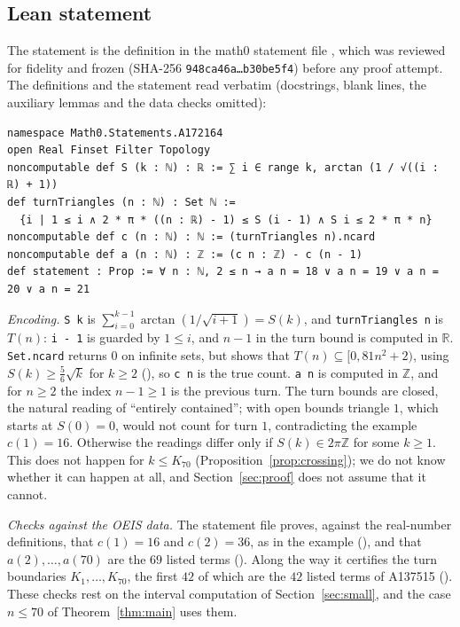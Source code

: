 \documentclass[11pt]{amsart}
\theoremstyle{plain}
\theoremstyle{definition}
\begin{document}
\subsection*{Lean statement}
The statement is the definition  in the math0 statement file , which was reviewed for fidelity and frozen (SHA-256 \texttt{948ca46a\dots b30be5f4}) before any proof attempt.
The definitions and the statement read verbatim (docstrings, blank lines, the auxiliary lemmas and the data checks omitted):\par\nobreak\noindent
\begin{minipage}{\linewidth}
\begin{lstlisting}
namespace Math0.Statements.A172164
open Real Finset Filter Topology
noncomputable def S (k : ℕ) : ℝ := ∑ i ∈ range k, arctan (1 / √((i : ℝ) + 1))
def turnTriangles (n : ℕ) : Set ℕ :=
  {i | 1 ≤ i ∧ 2 * π * ((n : ℝ) - 1) ≤ S (i - 1) ∧ S i ≤ 2 * π * n}
noncomputable def c (n : ℕ) : ℕ := (turnTriangles n).ncard
noncomputable def a (n : ℕ) : ℤ := (c n : ℤ) - c (n - 1)
def statement : Prop := ∀ n : ℕ, 2 ≤ n → a n = 18 ∨ a n = 19 ∨ a n = 20 ∨ a n = 21
\end{lstlisting}
\end{minipage}

\emph{Encoding.} \texttt{S k} is $\sum_{i=0}^{k-1}\arctan(1/\sqrt{i+1})=S(k)$, and \texttt{turnTriangles n} is $T(n)$: \texttt{i - 1} is guarded by $1\le i$, and $n-1$ in the turn bound is computed in $\mathbb R$.
\texttt{Set.ncard} returns $0$ on infinite sets, but  shows that $T(n)\subseteq[0,81n^2+2)$, using $S(k)\ge\frac56\sqrt k$ for $k\ge2$ (), so \texttt{c n} is the true count.
\texttt{a n} is computed in $\mathbb Z$, and for $n\ge2$ the index $n-1\ge1$ is the previous turn.
The turn bounds are closed, the natural reading of ``entirely contained''; with open bounds triangle $1$, which starts at $S(0)=0$, would not count for turn $1$, contradicting the example $c(1)=16$. Otherwise the readings differ only if $S(k)\in2\pi\mathbb Z$ for some $k\ge1$. This does not happen for $k\le K_{70}$ (Proposition~\ref{prop:crossing}); we do not know whether it can happen at all, and Section~\ref{sec:proof} does not assume that it cannot.

\emph{Checks against the OEIS data.} The statement file proves, against the real-number definitions, that $c(1)=16$ and $c(2)=36$, as in the example (), and that $a(2),\dots,a(70)$ are the $69$ listed terms ().
Along the way it certifies the turn boundaries $K_1,\dots,K_{70}$, the first $42$ of which are the $42$ listed terms of A137515 ().
These checks rest on the interval computation of Section~\ref{sec:small}, and the case $n\le70$ of Theorem~\ref{thm:main} uses them.
\end{document}
